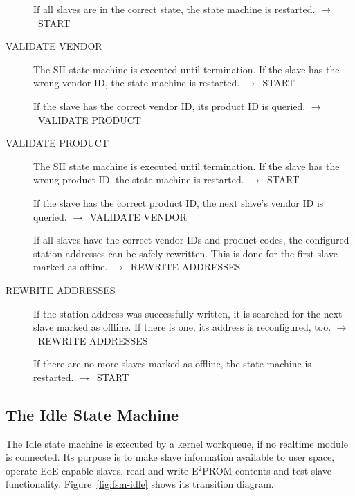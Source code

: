 \documentclass[a4paper,12pt,BCOR6mm,bibtotoc,idxtotoc]{scrbook}
\begin{document}
\begin{description}
  If all slaves are in the correct state, the state machine is
  restarted. $\rightarrow$~START

\item[VALIDATE VENDOR] The SII state machine is executed until
  termination. If the slave has the wrong vendor ID, the state machine
  is restarted. $\rightarrow$~START

  If the slave has the correct vendor ID, its product ID is queried.
  $\rightarrow$~VALIDATE PRODUCT

\item[VALIDATE PRODUCT] The SII state machine is executed until
  termination. If the slave has the wrong product ID, the state
  machine is restarted. $\rightarrow$~START

  If the slave has the correct product ID, the next slave's vendor ID
  is queried. $\rightarrow$~VALIDATE VENDOR

  If all slaves have the correct vendor IDs and product codes, the
  configured station addresses can be safely rewritten. This is done
  for the first slave marked as offline.
  $\rightarrow$~REWRITE ADDRESSES

\item[REWRITE ADDRESSES] If the station address was successfully
  written, it is sear\-ched for the next slave marked as offline. If
  there is one, its address is reconfigured, too.
  $\rightarrow$~REWRITE ADDRESSES

  If there are no more slaves marked as offline, the state machine is
  restarted. $\rightarrow$~START
\end{description}


\subsection{The Idle State Machine}
\label{sec:fsm-idle}

The Idle state machine is executed by a kernel workqueue, if no
realtime module is connected. Its purpose is to make slave information
available to user space, operate EoE-capable slaves, read and write
E$^2$PROM contents and test slave functionality.
Figure~\ref{fig:fsm-idle} shows its transition diagram.
\end{document}

